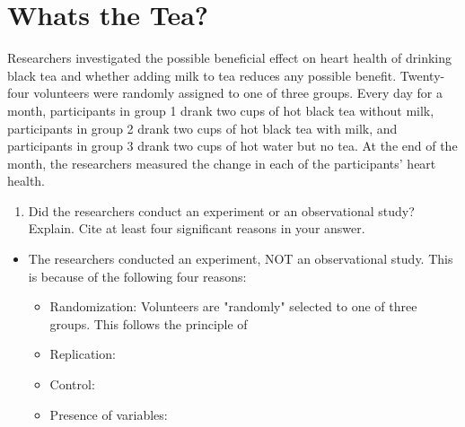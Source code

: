 \documentclass[letterpaper]{article}
\def\tightlist{}
\newcommand{\titleDOC}{}
\newcommand{\authorDOC}{Daniel Sabalakov}
\newcommand{\classDOC}{}
\newcommand{\quoteDOC}{``\textit{Truth is ever to be found in the simplicity, and not in the multiplicity and confusion of things}'' - Issac Newton}
\begin{document}








\renewcommand{\authorDOC}{Daniel Sabalakov}

\renewcommand{\classDOC}{DE Intro to Statistics I}

\renewcommand{\titleDOC}{What's the Tea}

\renewcommand{\quoteDOC}{``\textit{It's times like these you learn to live again + It's times like these you give and give again + It's times like these you learn to love again + It's times like these time and time again }'' - Foo Fighters}



\section{What\textquotesingle s the Tea?}\label{whats-the-tea}

Researchers investigated the possible beneficial effect on heart health of drinking black tea and whether adding milk to tea reduces any possible benefit. Twenty-four volunteers were randomly assigned to one of three groups. Every day for a month, participants in group 1 drank two cups of hot black tea without milk, participants in group 2 drank two cups of hot black tea with milk, and participants in group 3 drank two cups of hot water but no tea. At the end of the month, the researchers measured the change in each of the participants' heart health.

\begin{enumerate}
\def\labelenumi{(\alph{enumi})}
\tightlist
\item
  Did the researchers conduct an experiment or an observational study? Explain. Cite at least four significant reasons in your answer.
\end{enumerate}

\begin{itemize}
\tightlist
\item
  The researchers conducted an experiment, NOT an observational study. This is because of the following four reasons:

  \begin{itemize}
  \tightlist
  \item
    Randomization: Volunteers are "randomly" selected to one of three groups. This follows the principle of
  \item
    Replication:
  \item
    Control:
  \item
    Presence of variables:
  \end{itemize}
\end{itemize}
\end{document}
